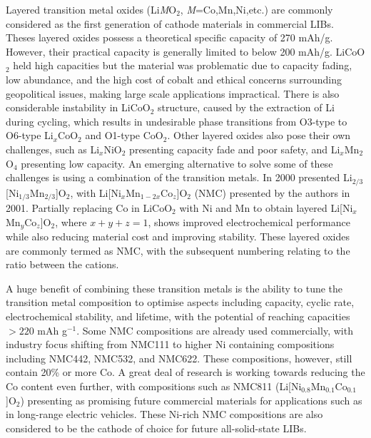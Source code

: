 \documentclass[../main.tex]{subfiles}
\begin{document}
Layered transition metal oxides (Li\textit{M}O$_2$, \textit{M}=Co,Mn,Ni,etc.) are commonly considered as the first generation of cathode materials in commercial LIBs. Theses layered oxides possess a theoretical specific capacity of 270 mAh/g. However, their practical capacity is generally limited to below 200 mAh/g. \cite{myung2017nickel} LiCoO$_2$ held high capacities but the material was problematic due to capacity fading, low abundance, and the high cost of cobalt and ethical concerns surrounding geopolitical issues, making large scale applications impractical. \cite{mo2018impact} There is also considerable instability in LiCoO$_2$ structure, caused by the extraction of Li during cycling, which results in undesirable phase transitions from O3-type to O6-type Li$_x$CoO$_2$ and O1-type CoO$_2$. \cite{goonetilleke2018structural,chen2002staging} Other layered oxides also pose their own challenges, such as Li$_x$NiO$_2$ presenting capacity fade and poor safety, \cite{min2016comparative} and Li$_x$Mn$_2$O$_4$ presenting low capacity. \cite{tian2018performance} An emerging alternative to solve some of these challenges is using a combination of the transition metals. In 2000 \citeauthor{paulsen2000o2} presented Li$_{2/3}$[Ni$_{1/3}$Mn$_{2/3}$]O$_2$, \cite{paulsen2000o2,paulsen20002} with Li[Ni$_x$Mn$_{1-2x}$Co$_z$]O$_2$ (NMC) presented by the authors in 2001. \cite{lu2001layered} Partially replacing Co in LiCoO$_2$ with Ni and Mn to obtain layered Li[Ni$_x$Mn$_y$Co$_z$]O$_2$, \cite{rozier2015li} where $x+y+z=1$, shows improved electrochemical performance while also reducing material cost and improving stability.\cite{ohzuku2001layered} These layered oxides are commonly termed as NMC, with the subsequent numbering relating to the ratio between the cations.

A huge benefit of combining these transition metals is the ability to tune the transition metal composition to optimise aspects including capacity, cyclic rate, electrochemical stability, and lifetime, with the potential of reaching capacities $>220$ mAh g$^{-1}$. \cite{duan2019insights} Some NMC compositions are already used commercially, with industry focus shifting from NMC111 to higher Ni containing compositions including NMC442, NMC532, and NMC622. \cite{zhang2018structural} These compositions, however, still contain 20\% or more Co. A great deal of research is working towards reducing the Co content even further, with compositions such as NMC811 (Li[Ni$_{0.8}$Mn$_{0.1}$Co$_{0.1}$]O$_2$) presenting as promising future commercial materials for applications such as in long-range electric vehicles. \cite{azevedo2018mining} These Ni-rich NMC compositions are also considered to be the cathode of choice for future all-solid-state LIBs. \cite{myung2017nickel}
\end{document}
